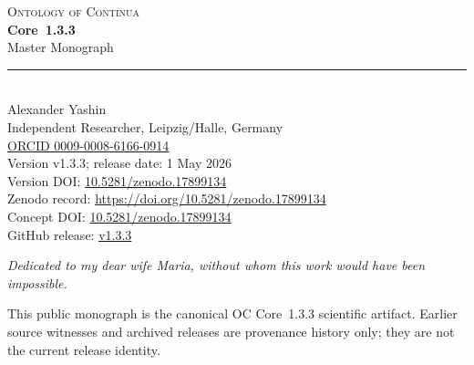 \begin{titlepage}
\label{sec:oc133-title-page}
\thispagestyle{empty}
\begin{center}
\vspace*{1.0cm}
{\sffamily\Large\color{ocTitleBlue}\textsc{Ontology of Continua}}\\[0.38cm]
{\sffamily\Huge\bfseries Core~1.3.3}\\[0.28cm]
{\sffamily\Large Master Monograph}\\[0.75cm]
{\color{ocTitleGold}\rule{0.42\textwidth}{0.5pt}}\\[0.95cm]

{\Large Alexander Yashin}\\[0.2cm]
{\normalsize Independent Researcher, Leipzig/Halle, Germany}\\[0.2cm]
{\normalsize \href{https://orcid.org/0009-0008-6166-0914}{ORCID 0009-0008-6166-0914}}\\[1.0cm]

{\normalsize Version v1.3.3; release date: 1 May 2026}\\[0.35cm]
{\normalsize Version DOI: \href{https://doi.org/10.5281/zenodo.17899134}{10.5281/zenodo.17899134}}\\[0.2cm]
{\normalsize Zenodo record: \href{https://doi.org/10.5281/zenodo.17899134}{https://doi.org/10.5281/zenodo.17899134}}\\[0.2cm]
{\normalsize Concept DOI: \href{https://doi.org/10.5281/zenodo.17899134}{10.5281/zenodo.17899134}}\\[0.2cm]
{\normalsize GitHub release: \href{https://github.com/alexanderyashin/ontology-of-continua-core-main/releases/tag/v1.3.3}{v1.3.3}}\\[0.9cm]

\vfill

{\small\itshape Dedicated to my dear wife Maria, without whom this work would have been impossible.}\\[0.8cm]

\begin{minipage}{0.86\textwidth}
\centering\scriptsize
This public monograph is the canonical OC Core~1.3.3 scientific artifact.
Earlier source witnesses and archived releases are provenance history only; they are not the current release identity.
\end{minipage}
\end{center}
\end{titlepage}

